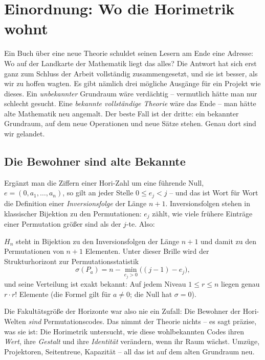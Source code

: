 \chapter{Einordnung: Wo die Horimetrik wohnt}
\label{ch:einordnung}


Ein Buch über eine neue Theorie schuldet seinen Lesern am Ende eine
Adresse: Wo auf der Landkarte der Mathematik liegt das alles? Die
Antwort hat sich erst ganz zum Schluss der Arbeit vollständig
zusammengesetzt, und sie ist besser, als wir zu hoffen wagten. Es
gibt nämlich drei mögliche Ausgänge für ein Projekt wie dieses. Ein
\emph{unbekannter} Grundraum wäre verdächtig -- vermutlich hätte man
nur schlecht gesucht. Eine \emph{bekannte vollständige Theorie} wäre
das Ende -- man hätte alte Mathematik neu angemalt. Der beste Fall
ist der dritte: ein bekannter Grundraum, auf dem neue Operationen
und neue Sätze stehen. Genau dort sind wir gelandet.

\section{Die Bewohner sind alte Bekannte}

Ergänzt man die Ziffern einer Hori-Zahl um eine führende Null,
$e=(0,a_1,\ldots,a_n)$, so gilt an jeder Stelle $0\le e_j<j$ -- und
das ist Wort für Wort die Definition einer
\emph{Inversionsfolge} der Länge $n{+}1$. Inversionsfolgen stehen
in klassischer Bijektion zu den Permutationen: $e_j$ zählt, wie
viele frühere Einträge einer Permutation größer sind als der
$j$-te. Also:

\begin{satz}[Register S44]
$H_n$ steht in Bijektion zu den Inversionsfolgen der Länge $n{+}1$
und damit zu den Permutationen von $n{+}1$ Elementen. Unter dieser
Brille wird der Strukturhorizont zur Permutationsstatistik
\[
\sigma(P_a)=n-\min_{e_j>0}\bigl((j{-}1)-e_j\bigr),
\]
und seine Verteilung ist exakt bekannt: Auf jedem Niveau
$1\le r\le n$ liegen genau $r\cdot r!$ Elemente (die Formel gilt
für $a\ne0$; die Null hat $\sigma=0$).
\end{satz}

Die Fakultätsgröße der Horizonte war also nie ein Zufall: Die
Bewohner der Hori-Welten \emph{sind} Permutationscodes. Das nimmt
der Theorie nichts -- es sagt präzise, was sie ist: Die Horimetrik
untersucht, wie diese wohlbekannten Codes ihren \emph{Wert}, ihre
\emph{Gestalt} und ihre \emph{Identität} verändern, wenn ihr Raum
wächst. Umzüge, Projektoren, Seitentreue, Kapazität -- all das ist
auf dem alten Grundraum neu.

